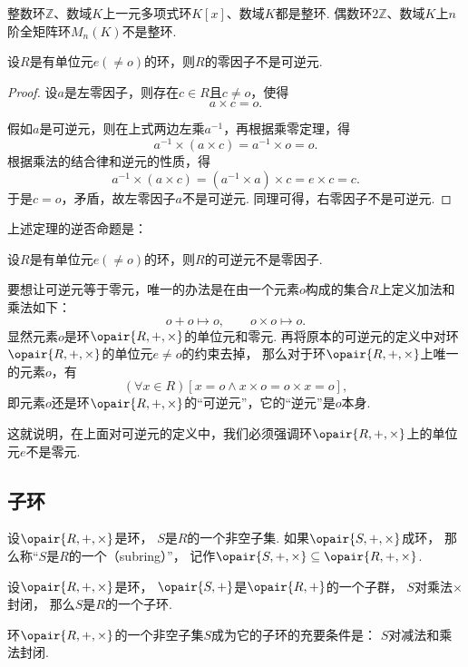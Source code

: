 \begin{example}
整数环\(\mathbb{Z}\)、数域\(K\)上一元多项式环\(K[x]\)、数域\(K\)都是整环.
偶数环\(2\mathbb{Z}\)、数域\(K\)上\(n\)阶全矩阵环\(M_n(K)\)不是整环.
\end{example}

\begin{theorem}
设\(R\)是有单位元\(e(\neq o)\)的环，则\(R\)的零因子不是可逆元.
\begin{proof}
设\(a\)是左零因子，则存在\(c \in R\)且\(c \neq o\)，使得\[
    a \times c = o.
\]

假如\(a\)是可逆元，则在上式两边左乘\(a^{-1}\)，再根据乘零定理，得\[
    a^{-1} \times (a \times c) = a^{-1} \times o = o.
\]
根据乘法的结合律和逆元的性质，得\[
    a^{-1} \times (a \times c) = (a^{-1} \times a) \times c = e \times c = c.
\]
于是\(c = o\)，矛盾，故左零因子\(a\)不是可逆元.
同理可得，右零因子不是可逆元.
\end{proof}
\end{theorem}

上述定理的逆否命题是：
\begin{corollary}
设\(R\)是有单位元\(e(\neq o)\)的环，则\(R\)的可逆元不是零因子.
\end{corollary}

\begin{example}
要想让可逆元等于零元，唯一的办法是在由一个元素\(o\)构成的集合\(R\)上定义加法和乘法如下：\[
    o + o \mapsto o,
    \qquad
    o \times o \mapsto o.
\]
显然元素\(o\)是环\(\opair{R,+,\times}\)的单位元和零元.
再将原本的可逆元的定义中对环\(\opair{R,+,\times}\)的单位元\(e \neq o\)的约束去掉，
那么对于环\(\opair{R,+,\times}\)上唯一的元素\(o\)，有\[
    (\forall x \in R)[x = o \land x \times o = o \times x = o],
\]
即元素\(o\)还是环\(\opair{R,+,\times}\)的“可逆元”，它的“逆元”是\(o\)本身.

这就说明，在上面对可逆元的定义中，我们必须强调环\(\opair{R,+,\times}\)上的单位元\(e\)不是零元.
\end{example}

\subsection{子环}
\begin{definition}
设\(\opair{R,+,\times}\)是环，
\(S\)是\(R\)的一个非空子集.
如果\(\opair{S,+,\times}\)成环，
那么称“\(S\)是\(R\)的一个（subring）”，
记作\(\opair{S,+,\times}\subseteq\opair{R,+,\times}\).
\end{definition}

\begin{proposition}
设\(\opair{R,+,\times}\)是环，
\(\opair{S,+}\)是\(\opair{R,+}\)的一个子群，
\(S\)对乘法\(\times\)封闭，
那么\(S\)是\(R\)的一个子环.
\end{proposition}

\begin{proposition}
环\(\opair{R,+,\times}\)的一个非空子集\(S\)成为它的子环的充要条件是：
\(S\)对减法和乘法封闭.
\end{proposition}
